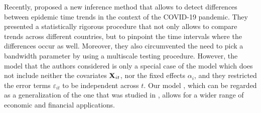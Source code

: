 \documentclass[a4paper,12pt]{article}
\makeatletter
\renewcommand{\eqref}[1]{\tagform@{\ref{#1}}}
\makeatother
\begin{document}
Recently, \cite{KhismatullinaVogt2021} proposed a new inference method that allows to detect differences between epidemic time trends in the context of the COVID-19 pandemic. They presented a statistically rigorous procedure that not only allows to compare trends across different countries, but to pinpoint the time intervals where the differences occur as well. Moreover, they also circumvented the need to pick a bandwidth parameter by using a multiscale testing procedure. However, the model that the authors considered is only a special case of the model \eqref{eq:model} which does not include neither the covariates $\mathbf{X}_{it}$, nor the fixed effects $\alpha_i$, and they restricted the error terms $\varepsilon_{it}$ to be independent across $t$. Our model \eqref{eq:model}, which can be regarded as a generalization of the one that was studied in \cite{KhismatullinaVogt2021}, allows for a wider range of economic and financial applications.


\end{document}
